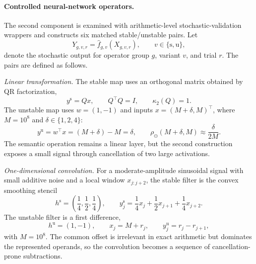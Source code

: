 \documentclass[manuscript, screen]{acmart}
\begin{document}
\paragraph{Controlled neural-network operators.}
The second component is examined with arithmetic-level stochastic-validation wrappers and constructs six matched stable/unstable pairs. Let
\begin{equation}
Y_{g,v,r}
=
\widehat{f}_{g,v}\!\left(X_{g,v,r}\right),
\qquad
v\in\{\mathrm{s},\mathrm{u}\},
\label{eq:controlled-operator-lift}
\end{equation}
denote the stochastic output for operator group $g$, variant $v$, and trial $r$. The pairs are defined as follows.

\emph{Linear transformation.}
The stable map uses an orthogonal matrix obtained by QR factorization,
\begin{equation}
y^{\mathrm{s}}=Qx,
\qquad
Q^\top Q=I,
\qquad
\kappa_2(Q)=1.
\label{eq:controlled-linear-stable}
\end{equation}
The unstable map uses $w=(1,-1)$ and inputs $x=(M+\delta,M)^\top$, where $M=10^8$ and $\delta\in\{1,2,4\}$:
\begin{equation}
y^{\mathrm{u}}
=
w^\top x
=
(M+\delta)-M
=
\delta,
\qquad
\rho_{\ominus}(M+\delta,M)
\approx
\frac{\delta}{2M}.
\label{eq:controlled-linear-unstable}
\end{equation}
The semantic operation remains a linear layer, but the second construction exposes a small signal through cancellation of two large activations.

\emph{One-dimensional convolution.}
For a moderate-amplitude sinusoidal signal with small additive noise and a local window $x_{j:j+2}$, the stable filter is the convex smoothing stencil
\begin{equation}
h^{\mathrm{s}}=\left(\frac14,\frac12,\frac14\right),
\qquad
y_j^{\mathrm{s}}=\frac14x_j+\frac12x_{j+1}+\frac14x_{j+2}.
\label{eq:controlled-conv-stable}
\end{equation}
The unstable filter is a first difference,
\begin{equation}
h^{\mathrm{u}}=(1,-1),
\qquad
x_j=M+r_j,
\qquad
y_j^{\mathrm{u}}=r_j-r_{j+1},
\label{eq:controlled-conv-unstable}
\end{equation}
with $M=10^8$. The common offset is irrelevant in exact arithmetic but dominates the represented operands, so the convolution becomes a sequence of cancellation-prone subtractions.
\end{document}
